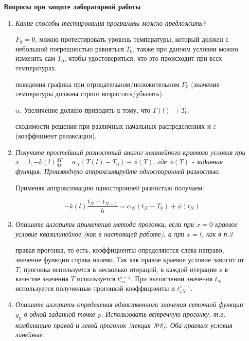 \underline{\textbf{Вопросы при защите лабораторной работы}}\\
\begin{enumerate}
\item \textit{Какие способы тестирования программы можно предложить?}

 $F_0 = 0$, можно протестировать уровень температуры, который должен с небольшой погрешностью равняться $T_0$, также при данном условии можно изменить сам $T_0$, чтобы удостовериться, что это происходит при всех температурах.

 поведения графика при отрицательном/положительном $F_0$ (значение температуры должны строго возрастать/убывать).

 $\alpha$. Увеличение должно приводить к тому, что $T(l) \rightarrow T_0$.

 сходимости решения при различных начальных распределениях и $\varepsilon$ (коэффициент релаксации).

\item \textit{Получите простейший разностный аналог нелинейного краевого условия при
$x = l, -k(l)\frac{dT}{dx} = \alpha_N(T(l) - T_0) + \phi(T).$
где $\phi(T)$ - заданная функция.
Производную аппроксимируйте односторонней разностью.}

Применяя аппроксимацию односторонней разностью получаем:

\begin{equation}
	-k(l)\dfrac{t_N - t_{N-1}}{h} = \alpha_N(t_N - T_0) + \phi(t_N)
\end{equation}

\item \textit{Опишите алгоритм применения метода прогонки, если при $x = 0$ краевое условие квазилинейное (как в настоящей работе), а при $x = l$, как в п.2}

 правая прогонка, то есть, коэффициенты определяются слева направо, значение функции справа налево. Так как правое краевое условие зависит от $T$, прогонка используется в несколько итераций, в каждой итерации $s$ в качестве значения $T$ используется $t_{\varepsilon n}^{s-1}$. При вычислении значения $t_N$ используется полученные прогонкой коэффициенты и $t_{\varepsilon N}^{s-1}$. 

\item  \textit{Опишите алгоритм определения единственного значения сеточной функции $y_p$ в одной заданной точке p. Использовать встречную прогонку, т.е. комбинацию правой и левой прогонок (лекция №8). Оба краевых условия линейные.}


\end{enumerate}
